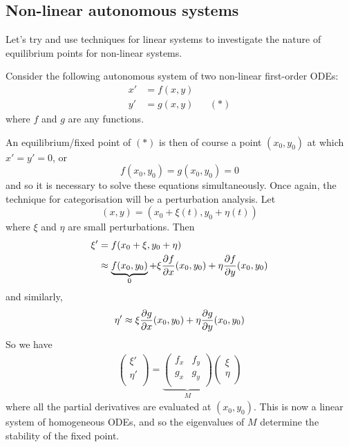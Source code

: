 \documentclass{../../template/note}
\begin{document}
    
    \subsection{Non-linear autonomous systems}

    Let's try and use techniques for linear systems to investigate the nature of equilibrium points for non-linear systems.

    Consider the following autonomous system of two non-linear first-order ODEs:
    \begin{align*}
        x' &= f(x, y) \\
        y' &= g(x, y) && (*)
    \end{align*}
    where \(f\) and \(g\) are any functions.
    
    An equilibrium/fixed point of \((*)\) is then of course a point \((x_0, y_0)\) at which \(x' = y' = 0\), or
    \[
        f(x_0, y_0) = g(x_0, y_0) = 0
    \]
    and so it is necessary to solve these equations simultaneously. Once again, the technique for categorisation will be a perturbation analysis. Let
    \[
        (x, y) = (x_0 + \xi(t), y_0 + \eta(t))
    \]
    where \(\xi\) and \(\eta\) are small perturbations. Then
    \begin{align*}
        \xi' &= f(x_0 + \xi, y_0 + \eta) \\
        &\approx \underbrace{f(x_0, y_0)}_{0} + \xi \pd f x(x_0, y_0) + \eta \pd f y (x_0, y_0)
    \end{align*}
    and similarly,
    \[
        \eta' \approx \xi \pd g x(x_0, y_0) + \eta \pd g y (x_0, y_0)
    \]
    So we have
    \begin{align*}
        \begin{pmatrix}
         \xi' \\
         \eta' \\
        \end{pmatrix} = \underbrace{\begin{pmatrix}
         f_x & f_y \\
         g_x & g_y \\
        \end{pmatrix}}_M \begin{pmatrix}
         \xi \\
         \eta \\
        \end{pmatrix}
    \end{align*}
    where all the partial derivatives are evaluated at \((x_0, y_0)\). This is now a linear system of homogeneous ODEs, and so the eigenvalues of \(M\) determine the stability of the fixed point.
    
\end{document}
